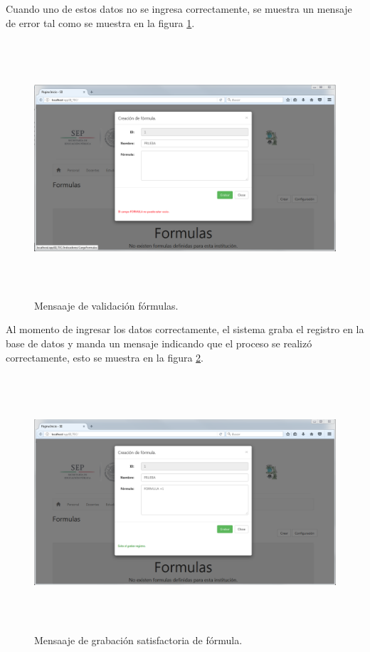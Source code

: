 			Cuando uno de estos datos no se ingresa correctamente, se muestra un mensaje de error tal como se muestra en la figura \ref{fig_FormulaValida}.\\

			\begin{figure}[]
		        \centering
		        \includegraphics[width=16cm, height=9.5cm]{figuras/FormulaValida}
		        \caption{Mensaaje de validaci\'on f\'ormulas.}
		        \label{fig_FormulaValida}
		    \end{figure}

		    Al momento de ingresar los datos correctamente, el sistema graba el registro en la base de datos y manda un mensaje indicando que el proceso se realiz\'o correctamente, esto se muestra en la figura \ref{img_FormulasGraba}.\\

		    \begin{figure}[]
		        \centering
		        \includegraphics[width=16cm, height=9.5cm]{figuras/FormulasGraba}
		        \caption{Mensaaje de grabaci\'on satisfactoria de f\'ormula.}
		        \label{img_FormulasGraba}
		    \end{figure}


